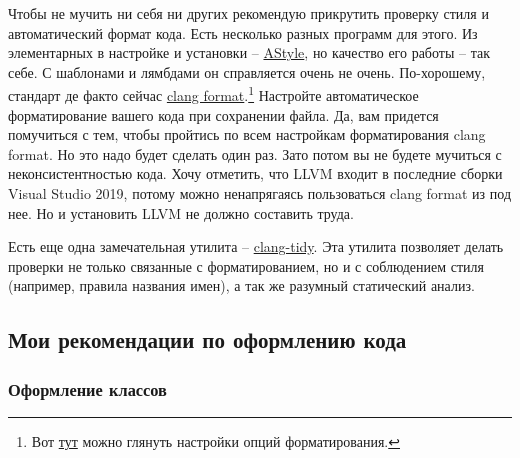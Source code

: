 \documentclass{article}
\begin{document}
Чтобы не мучить ни себя ни других рекомендую прикрутить проверку стиля и автоматический формат кода. Есть несколько разных программ для этого. Из элементарных в настройке и установки -- \href{http://astyle.sourceforge.net/}{AStyle}, но качество его работы -- так себе. С шаблонами и лямбдами он справляется очень не очень. По-хорошему, стандарт де факто сейчас \href{https://clang.llvm.org/docs/ClangFormat.html}{clang format}.\footnote{Вот \href{https://clang.llvm.org/docs/ClangFormatStyleOptions.html}{тут} можно глянуть настройки опций форматирования.} Настройте автоматическое форматирование вашего кода при сохранении файла. Да, вам придется помучиться с тем, чтобы пройтись по всем настройкам форматирования clang format. Но это надо будет сделать один раз. Зато потом вы не будете мучиться с неконсистентностью кода. Хочу отметить, что LLVM входит в последние сборки Visual Studio 2019, потому можно ненапрягаясь пользоваться clang format из под нее. Но и установить LLVM не должно составить труда.

Есть еще одна замечательная утилита -- \href{https://clang.llvm.org/extra/clang-tidy/}{clang-tidy}. Эта утилита позволяет делать проверки не только связанные с форматированием, но и с соблюдением стиля (например, правила названия имен), а так же разумный статический анализ.

\subsection{Мои рекомендации по оформлению кода}

\subsubsection{Оформление классов}
\end{document}
